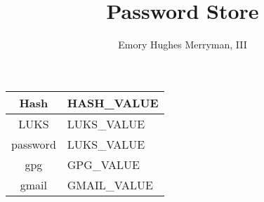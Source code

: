 \documentclass{article}
\begin{document}
\title{Password Store}
\author{Emory Hughes Merryman, III}
\maketitle
\begin{tabular}{||c|p{10cm}||}
  \hline
  Hash & HASH_VALUE \\ \hline
  LUKS & LUKS_VALUE \\ \hline
  password & LUKS_VALUE \\ \hline
  gpg & GPG_VALUE \\ \hline
  gmail & GMAIL_VALUE \\ \hline
  \hline
\end{tabular}
\end{document}

